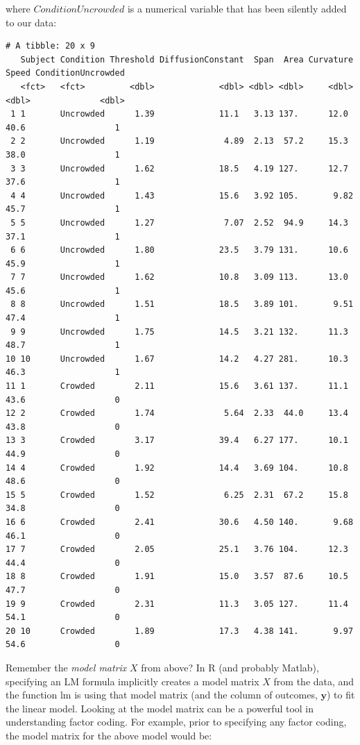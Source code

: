\documentclass[
]{article}
\begin{document}
where \(ConditionUncrowded\) is a numerical variable that has been
silently added to our data:

\footnotesize

\begin{verbatim}
# A tibble: 20 x 9
   Subject Condition Threshold DiffusionConstant  Span  Area Curvature Speed ConditionUncrowded
   <fct>   <fct>         <dbl>             <dbl> <dbl> <dbl>     <dbl> <dbl>              <dbl>
 1 1       Uncrowded      1.39             11.1   3.13 137.      12.0   40.6                  1
 2 2       Uncrowded      1.19              4.89  2.13  57.2     15.3   38.0                  1
 3 3       Uncrowded      1.62             18.5   4.19 127.      12.7   37.6                  1
 4 4       Uncrowded      1.43             15.6   3.92 105.       9.82  45.7                  1
 5 5       Uncrowded      1.27              7.07  2.52  94.9     14.3   37.1                  1
 6 6       Uncrowded      1.80             23.5   3.79 131.      10.6   45.9                  1
 7 7       Uncrowded      1.62             10.8   3.09 113.      13.0   45.6                  1
 8 8       Uncrowded      1.51             18.5   3.89 101.       9.51  47.4                  1
 9 9       Uncrowded      1.75             14.5   3.21 132.      11.3   48.7                  1
10 10      Uncrowded      1.67             14.2   4.27 281.      10.3   46.3                  1
11 1       Crowded        2.11             15.6   3.61 137.      11.1   43.6                  0
12 2       Crowded        1.74              5.64  2.33  44.0     13.4   43.8                  0
13 3       Crowded        3.17             39.4   6.27 177.      10.1   44.9                  0
14 4       Crowded        1.92             14.4   3.69 104.      10.8   48.6                  0
15 5       Crowded        1.52              6.25  2.31  67.2     15.8   34.8                  0
16 6       Crowded        2.41             30.6   4.50 140.       9.68  46.1                  0
17 7       Crowded        2.05             25.1   3.76 104.      12.3   44.4                  0
18 8       Crowded        1.91             15.0   3.57  87.6     10.5   47.7                  0
19 9       Crowded        2.31             11.3   3.05 127.      11.4   54.1                  0
20 10      Crowded        1.89             17.3   4.38 141.       9.97  54.6                  0
\end{verbatim}

\normalsize

Remember the \emph{model matrix} \(X\) from above? In R (and probably
Matlab), specifying an LM formula implicitly creates a model matrix
\(X\) from the data, and the function lm is using that model matrix (and
the column of outcomes, \(\mathbf{y}\)) to fit the linear model. Looking
at the model matrix can be a powerful tool in understanding factor
coding. For example, prior to specifying any factor coding, the model
matrix for the above model would be:
\end{document}
